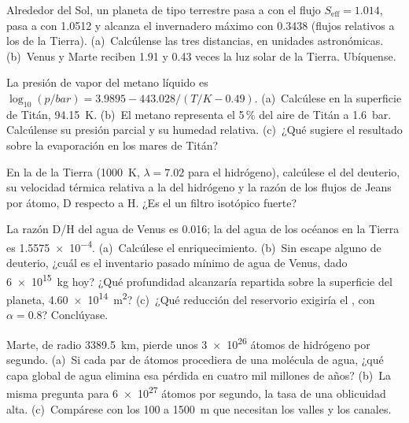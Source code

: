 \begin{exercise}[$\star$]\label{exo:b3:planetary-atmospheres:3}
Alrededor del Sol, un planeta de tipo terrestre pasa a  con el flujo $S_\mathrm{eff}
= 1.014$, pasa a  con 1.0512 y alcanza el invernadero máximo con 0.3438
(flujos relativos a los de la Tierra). (a)~Calcúlense las tres distancias, en
unidades astronómicas. (b)~Venus y Marte reciben 1.91 y 0.43 veces la
luz solar de la Tierra. Ubíquense.
\end{exercise}

\begin{exercise}[$\star$]\label{exo:b3:planetary-atmospheres:4}
La presión de vapor del metano líquido es $\log_{10}(p/\unit{bar}) = 3.9895 -
443.028/(T/\unit{K} - 0.49)$. (a)~Calcúlese en la superficie de Titán,
\qty{94.15}{K}. (b)~El metano representa el 5\,\% del aire de Titán a \qty{1.6}{bar}.
Calcúlense su presión parcial y su humedad relativa. (c)~¿Qué sugiere
el resultado sobre la evaporación en los mares de Titán?
\end{exercise}

\begin{exercise}[$\star\star$]\label{exo:b3:planetary-atmospheres:5}
En la  de la Tierra (\qty{1000}{K}, $\lambda = 7.02$ para el hidrógeno),
calcúlese el  del deuterio, su velocidad térmica relativa a la del
hidrógeno y la razón de los flujos de Jeans por átomo, D respecto a H. ¿Es el 
un filtro isotópico fuerte?
\end{exercise}

\begin{exercise}[$\star\star$]\label{exo:b3:planetary-atmospheres:6}
La razón D/H del agua de Venus es \num{0.016}; la del agua de los océanos en
la Tierra es \num{1.5575e-4}. (a)~Calcúlese el enriquecimiento. (b)~Sin escape
alguno de deuterio, ¿cuál es el inventario pasado mínimo de agua
de Venus, dado \qty{6e15}{kg} hoy? ¿Qué profundidad alcanzaría repartida sobre
la superficie del planeta, \qty{4.60e14}{m^2}? (c)~¿Qué reducción del reservorio
exigiría el , con $\alpha = 0.8$? Conclúyase.
\end{exercise}

\begin{exercise}[$\star\star$]\label{exo:b3:planetary-atmospheres:7}
Marte, de radio \qty{3389.5}{km}, pierde unos \num{3e26} átomos de hidrógeno
por segundo. (a)~Si cada par de átomos procediera de una molécula de agua, ¿qué
capa global de agua elimina esa pérdida en cuatro mil millones de años?
(b)~La misma pregunta para \num{6e27} átomos por segundo, la tasa de una
oblicuidad alta. (c)~Compárese con los 100 a \qty{1500}{m} que
necesitan los valles y los canales.
\end{exercise}

